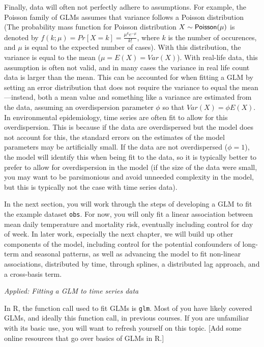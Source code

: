 \documentclass[
]{book}
\begin{document}
Finally, data will often not perfectly adhere to assumptions. For example, the
Poisson family of GLMs assumes that variance follows a Poisson distribution
(The probability mass function for Poisson distribution \(X \sim {\sf Poisson}(\mu)\) is denoted by \(f(k;\mu)=Pr[X=k]= \displaystyle \frac{\mu^{k}e^{-\mu}}{k!}\), where
\(k\) is the number of occurences, and \(\mu\) is equal to the expected number of
cases). With this distribution, the variance is equal to the mean (\(\mu=E(X)=Var(X)\)). With real-life data, this assumption is often not valid, and in many cases the variance in real life count data is larger than the mean. This can be accounted for when fitting a GLM by setting an error distribution that does not require the variance to equal the mean---instead, both a mean value and something like a
variance are estimated from the data, assuming an overdispersion parameter \(\phi\)
so that \(Var(X)=\phi E(X)\). In environmental epidemiology, time series
are often fit to allow for this overdispersion. This is because if the data are overdispersed but the model does not account for this, the standard errors on the
estimates of the model parameters may be artificially small. If the data are not overdispersed (\(\phi=1\)), the model will identify this when being fit to the data,
so it is typically better to prefer to allow for overdispersion in the model
(if the size of the data were small, you may want to be parsimonious and avoid
unneeded complexity in the model, but this is typically not the case with time
series data).

In the next section, you will work through the steps of developing a GLM to fit
the example dataset \texttt{obs}. For now, you will only fit a linear association
between mean daily temperature and mortality risk, eventually including control
for day of week. In later work, especially the next chapter, we will build up
other components of the model, including control for the potential confounders
of long-term and seasonal patterns, as well as advancing the model to fit
non-linear associations, distributed by time, through splines, a distributed lag
approach, and a cross-basis term.

\emph{Applied: Fitting a GLM to time series data}

In R, the function call used to fit GLMs is \texttt{glm}. Most of you have likely
covered GLMs, and ideally this function call, in previous courses. If you are
unfamiliar with its basic use, you will want to refresh yourself on this
topic. {[}Add some online resources that go over basics of GLMs in R.{]}
\end{document}
